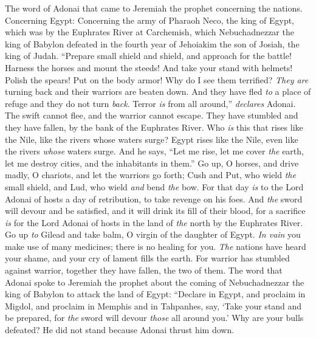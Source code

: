 \begin{biblechapter} %
 The word of Adonai that came to Jeremiah the prophet concerning the nations.
\verse Concerning Egypt: Concerning the army of Pharaoh Neco, the king of Egypt, which was by the Euphrates River at Carchemish, which Nebuchadnezzar the king of Babylon defeated in the fourth year of Jehoiakim the son of Josiah, the king of Judah.
\verse “Prepare small shield and shield, 
and approach for the battle!
\verse Harness the horses and mount the steeds! 
And take your stand with helmets! 
Polish the spears! 
Put on the body armor!
\verse Why do I see them terrified? 
\textit{They are} turning back 
and their warriors are beaten down. 
And they have fled \textit{to} a place of refuge 
and they do not turn \textit{back}. 
Terror \textit{is} from all around,” \textit{declares} Adonai.
\verse The swift cannot flee, 
and the warrior cannot escape. 
They have stumbled and they have fallen, 
by the bank of the Euphrates River.
\verse Who \textit{is} this that rises like the Nile, 
like the rivers whose waters surge?
\verse Egypt rises like the Nile, 
even like the rivers \textit{whose} waters surge. 
And he says, “Let me rise, 
let me cover \textit{the} earth, 
let me destroy cities, 
and the inhabitants in them.”
\verse Go up, O horses, 
and drive madly, O chariots, 
and let the warriors go forth; 
Cush and Put, who wield \textit{the} small shield, 
and Lud, who wield \textit{and} bend \textit{the} bow.
\verse For that day \textit{is} to the Lord Adonai of hosts 
a day of retribution, 
to take revenge on his foes. 
And \textit{the} sword will devour and be satisfied, 
and it will drink its fill of their blood, 
for a sacrifice \textit{is} for the Lord Adonai of hosts 
in the land of \textit{the} north by the Euphrates River.
\verse Go up \textit{to} Gilead and take balm, 
O virgin of the daughter of Egypt. 
\textit{In vain} you make use of many medicines; 
there is no healing for you.
\verse \textit{The} nations have heard your shame, 
and your cry of lament fills the earth. 
For warrior has stumbled against warrior, 
together they have fallen, the two of them.
\verse The word that Adonai spoke to Jeremiah the prophet about the coming of Nebuchadnezzar the king of Babylon to attack the land of Egypt:
\verse “Declare in Egypt, and proclaim in Migdol, 
and proclaim in Memphis and in Tahpanhes, 
say, ‘Take your stand and be prepared, 
for \textit{the} sword will devour \textit{those} all around you.’
\verse Why are your bulls defeated? 
He did not stand because Adonai thrust him down.

\end{biblechapter}

